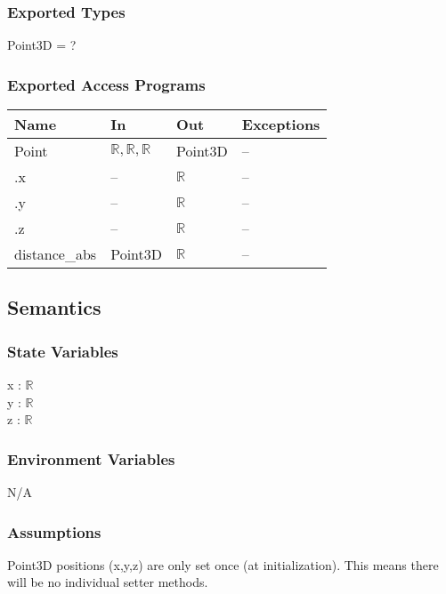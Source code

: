 \documentclass[12pt, titlepage]{article}
\begin{document}
\subsubsection{Exported Types}
Point3D = ?

\subsubsection{Exported Access Programs}
\begin{center}
	\begin{tabular}{p{4cm} p{2cm} p{2cm} p{4cm}}
		\hline
		\textbf{Name} & \textbf{In} & \textbf{Out} & \textbf{Exceptions} \\
		\hline
		Point & $\mathbb{R}, \mathbb{R}, \mathbb{R}$ & Point3D & -- \\
		.x & -- & $\mathbb{R}$ & -- \\
		.y & -- & $\mathbb{R}$ & -- \\		
		.z & -- & $\mathbb{R}$ & -- \\
		distance\_abs & Point3D & $\mathbb{R}$ & -- \\
		\hline
	\end{tabular}
\end{center}

\subsection{Semantics}
\subsubsection{State Variables}
x : $\mathbb{R}$ \\
y : $\mathbb{R}$ \\
z : $\mathbb{R}$ \\

\subsubsection{Environment Variables}
N/A

\subsubsection{Assumptions}
Point3D positions (x,y,z) are only set once (at initialization). This means 
there will be no individual setter methods.
\end{document}
